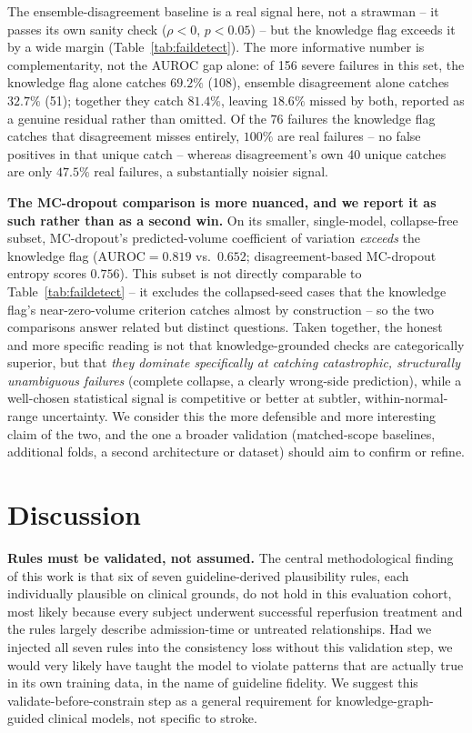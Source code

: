 \documentclass[conference]{IEEEtran}
\begin{document}
The ensemble-disagreement baseline is a real signal here, not a strawman -- it passes its own sanity check ($\rho<0$, $p<0.05$) -- but the knowledge flag exceeds it by a wide margin (Table~\ref{tab:faildetect}). The more informative number is complementarity, not the AUROC gap alone: of 156 severe failures in this set, the knowledge flag alone catches $69.2\%$ (108), ensemble disagreement alone catches $32.7\%$ (51); together they catch $81.4\%$, leaving $18.6\%$ missed by both, reported as a genuine residual rather than omitted. Of the 76 failures the knowledge flag catches that disagreement misses entirely, $100\%$ are real failures -- no false positives in that unique catch -- whereas disagreement's own 40 unique catches are only $47.5\%$ real failures, a substantially noisier signal.

\textbf{The MC-dropout comparison is more nuanced, and we report it as such rather than as a second win.} On its smaller, single-model, collapse-free subset, MC-dropout's predicted-volume coefficient of variation \emph{exceeds} the knowledge flag ($\mathrm{AUROC}=0.819$ vs.\ $0.652$; disagreement-based MC-dropout entropy scores $0.756$). This subset is not directly comparable to Table~\ref{tab:faildetect} -- it excludes the collapsed-seed cases that the knowledge flag's near-zero-volume criterion catches almost by construction -- so the two comparisons answer related but distinct questions. Taken together, the honest and more specific reading is not that knowledge-grounded checks are categorically superior, but that \emph{they dominate specifically at catching catastrophic, structurally unambiguous failures} (complete collapse, a clearly wrong-side prediction), while a well-chosen statistical signal is competitive or better at subtler, within-normal-range uncertainty. We consider this the more defensible and more interesting claim of the two, and the one a broader validation (matched-scope baselines, additional folds, a second architecture or dataset) should aim to confirm or refine.

\section{Discussion}

\textbf{Rules must be validated, not assumed.} The central methodological finding of this work is that six of seven guideline-derived plausibility rules, each individually plausible on clinical grounds, do not hold in this evaluation cohort, most likely because every subject underwent successful reperfusion treatment and the rules largely describe admission-time or untreated relationships. Had we injected all seven rules into the consistency loss without this validation step, we would very likely have taught the model to violate patterns that are actually true in its own training data, in the name of guideline fidelity. We suggest this validate-before-constrain step as a general requirement for knowledge-graph-guided clinical models, not specific to stroke.
\end{document}
